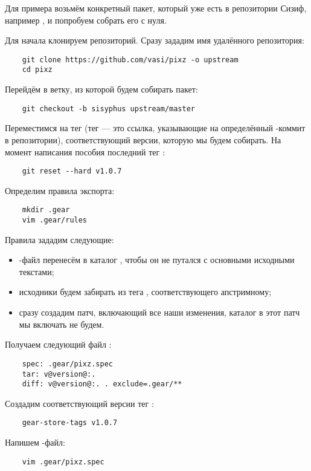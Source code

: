 
Для примера возьмём конкретный пакет, который уже есть в репозитории Сизиф, например , и попробуем
собрать его с нуля.

Для начала клонируем репозиторий. Сразу зададим имя удалённого репозитория: 
\begin{verbatim}
	git clone https://github.com/vasi/pixz -o upstream
	cd pixz
\end{verbatim}

Перейдём в ветку, из которой будем собирать пакет: 
\begin{verbatim}
	git checkout -b sisyphus upstream/master
\end{verbatim}

Переместимся на тег (тег --- это ссылка, указывающие на определённый -коммит в репозитории), 
соответствующий версии, которую мы будем собирать. На момент написания пособия последний тег : 
\begin{verbatim}
	git reset --hard v1.0.7
\end{verbatim}

Определим правила экспорта: 
\begin{verbatim}
	mkdir .gear
	vim .gear/rules
\end{verbatim}

Правила зададим следующие: 
\begin{itemize}
	\item {}-файл перенесём в каталог , чтобы он не путался с основными исходными текстами;
	\item исходники будем забирать из тега , соответствующего апстримному;
	\item сразу создадим патч, включающий все наши изменения, каталог  в этот патч мы включать не будем.
\end{itemize}

Получаем следующий файл :
\begin{verbatim}
	spec: .gear/pixz.spec
	tar: v@version@:.
	diff: v@version@:. . exclude=.gear/**
\end{verbatim}

Создадим соответствующий версии тег :
\begin{verbatim}
	gear-store-tags v1.0.7
\end{verbatim} 

Напишем -файл:
\begin{verbatim}
	vim .gear/pixz.spec
\end{verbatim} 

